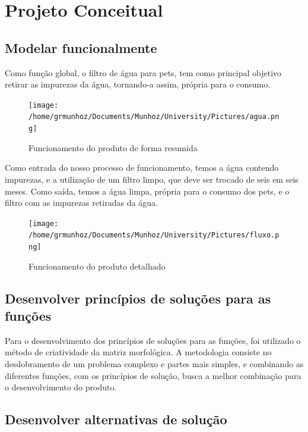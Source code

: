 \documentclass[
	12pt,				%
	openright,			%
	oneside,			%
	a4paper,			%
	english,			%
	french,				%
	spanish,			%
	brazil				%
	]{abntex2}
\begin{document}
\newpage
\chapter{Projeto Conceitual}

\section{Modelar funcionalmente}

Como função global, o filtro de água para pets, tem como principal objetivo retirar as impurezas da água, tornando-a assim, própria para o consumo.

\begin{figure}[H]
\begin{center}
\caption{Funcionamento do produto de forma resumida}
\texttt{[image: /home/grmunhoz/Documents/Munhoz/University/Pictures/agua.png]} 
\label{figetapas}
\end{center}
\end{figure}

Como entrada do nosso processo de funcionamento, temos a água contendo impurezas, e a utilização de um filtro limpo, que deve ser trocado de seis em seis meses. Como saída, temos a água limpa, própria para o consumo dos pets, e o filtro com as impurezas retiradas da água.

\begin{figure}[H]
\begin{center}
\caption{Funcionamento do produto detalhado}
\texttt{[image: /home/grmunhoz/Documents/Munhoz/University/Pictures/fluxo.png]} 
\label{figetapas}
\end{center}
\end{figure}


\section{Desenvolver princípios de soluções para as funções}

Para o desenvolvimento dos princípios de soluções para as funções, foi utilizado o método de criatividade da matriz morfológica. A metodologia consiste no desdobramento de um problema complexo e partes mais simples, e combinando as diferentes funções, com os princípios de solução, busca a melhor combinação para o desenvolvimento do produto.


\section{Desenvolver alternativas de solução}
\end{document}
